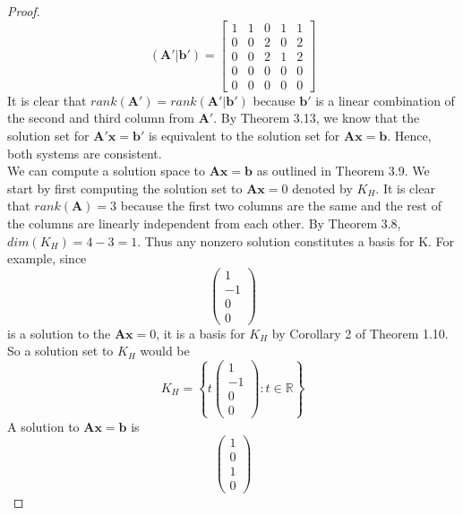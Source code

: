 \documentclass[11pt]{scrartcl}
\begin{document}
\begin{enumerate}[label=\alph*.]
{\begin{proof}
		      \[
			      (\mathbf{A'}|\mathbf{b'})=
			      \left [ \begin{array}{cccc|c}
					      1 & 1 & 0 & 1 & 1 \\
					      0 & 0 & 2 & 0 & 2 \\
					      0 & 0 & 2 & 1 & 2 \\
					      0 & 0 & 0 & 0 & 0 \\
					      0 & 0 & 0 & 0 & 0
				      \end{array} \right ]
		      \]
		      It is clear that  $rank(\mathbf{A'}) = rank(\mathbf{A'}|\mathbf{b'})$ because
		      $\mathbf{b'}$ is a linear combination of the second and third column from
		      $\mathbf{A'}$. By Theorem 3.13, we know that the solution set for $\mathbf{A'x=b'}$
		      is equivalent to the solution set for $\mathbf{Ax=b}$. Hence, both systems are consistent. \\
		      We can compute a solution space to $\mathbf{Ax=b}$ as outlined in Theorem 3.9. We start by first computing the
		      solution set to $\mathbf{Ax}=0$ denoted by $K_H$. It is clear that $rank(\mathbf{A}) = 3$ because the first two
		      columns are the same and the rest of the columns are linearly independent from each other.
		      By Theorem 3.8, $dim(K_H) = 4 - 3 = 1$. Thus any nonzero solution constitutes a basis for K. For example, since
		      $$
			      \begin{pmatrix}
				      1  \\
				      -1 \\
				      0  \\
				      0
			      \end{pmatrix}
		      $$
		      is a solution to the $\mathbf{Ax}=0$, it is a basis for $K_H$ by Corollary 2 of Theorem 1.10.
		      So a solution set to $K_H$ would be
		      \[
			      K_H=
			      \left\{
			      t\begin{pmatrix}
				      1  \\
				      -1 \\
				      0  \\
				      0
			      \end{pmatrix}: t \in \mathbb{R}
			      \right\}
		      \]
		      A solution to $\mathbf{Ax=b}$ is
		      $$
			      \begin{pmatrix}
				      1 \\
				      0 \\
				      1 \\
				      0
			      \end{pmatrix}
$$
\end{proof}}
\end{enumerate}
\end{document}
